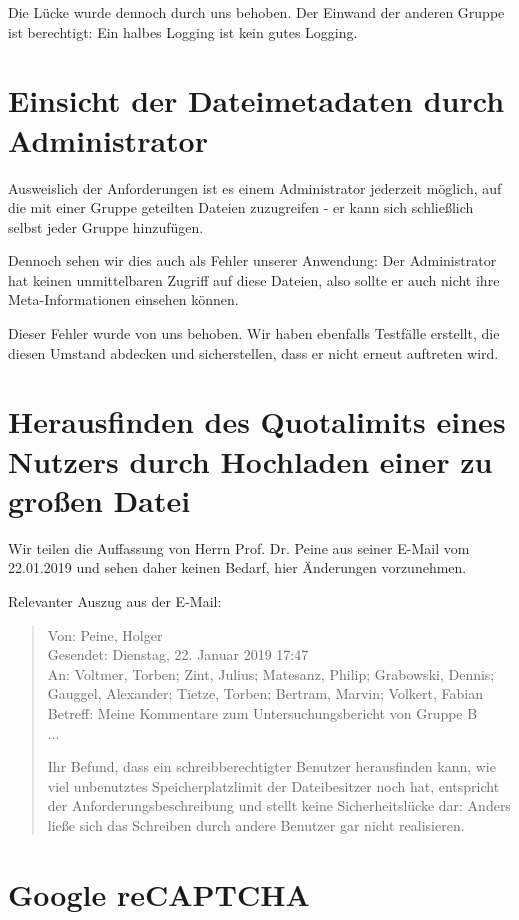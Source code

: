 \documentclass[12pt,DIV14,BCOR10mm,a4paper,parskip=half-,headsepline,headinclude,english,ngerman,bibliography=totocnumbered]{scrreprt}
\begin{document}
Die Lücke wurde dennoch durch uns behoben. Der Einwand der anderen Gruppe ist berechtigt: Ein halbes Logging ist kein gutes Logging.

\section{Einsicht der Dateimetadaten durch Administrator}

Ausweislich der Anforderungen ist es einem Administrator jederzeit möglich, auf die mit einer Gruppe geteilten Dateien zuzugreifen - er kann sich schließlich selbst jeder Gruppe hinzufügen.

Dennoch sehen wir dies auch als Fehler unserer Anwendung: Der Administrator hat keinen unmittelbaren Zugriff auf diese Dateien, also sollte er auch nicht ihre Meta-Informationen einsehen können.

Dieser Fehler wurde von uns behoben. Wir haben ebenfalls Testfälle erstellt, die diesen Umstand abdecken und sicherstellen, dass er nicht erneut auftreten wird.

\section{Herausfinden des Quotalimits eines Nutzers durch Hochladen einer zu großen Datei}

Wir teilen die Auffassung von Herrn Prof. Dr. Peine aus seiner E-Mail vom 22.01.2019 und sehen daher keinen Bedarf, hier Änderungen vorzunehmen.

Relevanter Auszug aus der E-Mail:

\blockquote{
Von: Peine, Holger \\
Gesendet: Dienstag, 22. Januar 2019 17:47 \\
An: Voltmer, Torben; Zint, Julius; Matesanz, Philip; Grabowski, Dennis; Gauggel, Alexander; Tietze, Torben; Bertram, Marvin; Volkert, Fabian  \\
Betreff: Meine Kommentare zum Untersuchungsbericht von Gruppe B \\

...

Ihr Befund, dass ein schreibberechtigter Benutzer herausfinden kann, wie viel
unbenutztes Speicherplatzlimit der Dateibesitzer noch hat, entspricht der
Anforderungsbeschreibung und stellt keine Sicherheitslücke dar: Anders ließe
sich das Schreiben durch andere Benutzer gar nicht realisieren.
}

\section{Google reCAPTCHA}
\end{document}
